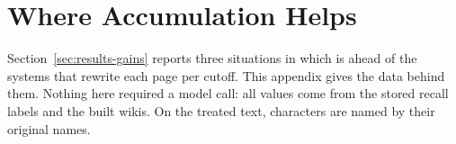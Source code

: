 \section{Where Accumulation Helps}
\label{app:accumulation}

Section~\ref{sec:results-gains} reports three situations in which \sys is ahead of the
systems that rewrite each page per cutoff. This appendix gives the data behind them. Nothing here required a model call: all values come from the
stored recall labels and the built wikis. On the treated text, characters are named by
their original names.

